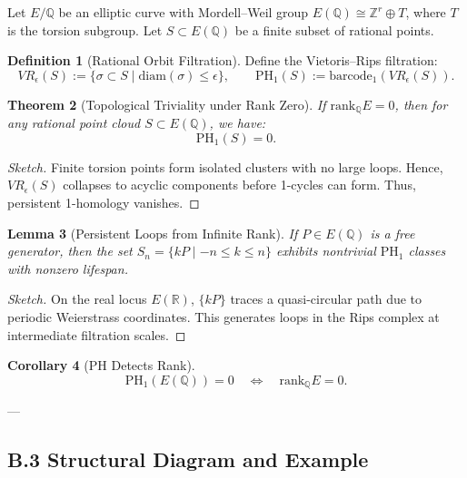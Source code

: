 \documentclass[11pt]{article}
\newtheorem{theorem}{Theorem}[section]
\newtheorem{lemma}[theorem]{Lemma}
\newtheorem{corollary}[theorem]{Corollary}
\theoremstyle{definition}
\newtheorem{definition}[theorem]{Definition}
\begin{document}
Let \( E/\mathbb{Q} \) be an elliptic curve with Mordell--Weil group \( E(\mathbb{Q}) \cong \mathbb{Z}^r \oplus T \),  
where \( T \) is the torsion subgroup. Let \( S \subset E(\mathbb{Q}) \) be a finite subset of rational points.

\begin{definition}[Rational Orbit Filtration]
Define the Vietoris--Rips filtration:
\[
VR_\epsilon(S) := \{ \sigma \subset S \mid \text{diam}(\sigma) \leq \epsilon \}, \qquad
\mathrm{PH}_1(S) := \text{barcode}_1(VR_\epsilon(S)).
\]
\end{definition}

\begin{theorem}[Topological Triviality under Rank Zero]
If \( \mathrm{rank}_{\mathbb{Q}} E = 0 \), then for any rational point cloud \( S \subset E(\mathbb{Q}) \), we have:
\[
\mathrm{PH}_1(S) = 0.
\]
\end{theorem}

\begin{proof}[Sketch]
Finite torsion points form isolated clusters with no large loops.  
Hence, \( VR_\epsilon(S) \) collapses to acyclic components before 1-cycles can form.  
Thus, persistent 1-homology vanishes.
\end{proof}

\begin{lemma}[Persistent Loops from Infinite Rank]
If \( P \in E(\mathbb{Q}) \) is a free generator, then the set \( S_n = \{ kP \mid -n \leq k \leq n \} \)  
exhibits nontrivial \( \mathrm{PH}_1 \) classes with nonzero lifespan.
\end{lemma}

\begin{proof}[Sketch]
On the real locus \( E(\mathbb{R}) \), \( \{kP\} \) traces a quasi-circular path due to periodic Weierstrass coordinates.  
This generates loops in the Rips complex at intermediate filtration scales.
\end{proof}

\begin{corollary}[PH Detects Rank]
\[
\mathrm{PH}_1(E(\mathbb{Q})) = 0 \quad \Leftrightarrow \quad \mathrm{rank}_{\mathbb{Q}}E = 0.
\]
\end{corollary}

---

\subsection*{B.3 Structural Diagram and Example}
\end{document}
